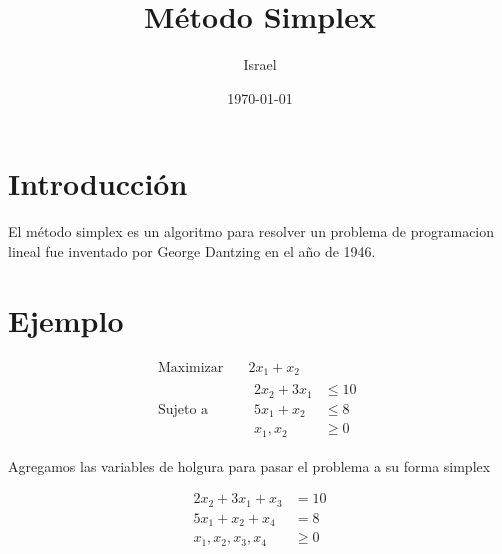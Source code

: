 \documentclass{article}
\title{Método Simplex}
\author{Israel}
\date{\today}
\begin{document}
\maketitle

\section{Introducción}
El método simplex es un algoritmo para resolver un problema de
programacion lineal fue inventado por George Dantzing en el año de
1946.

\section{Ejemplo}
\label{sec:ejemplo}


\begin{equation*}
  
  \begin{aligned}
   \text{Maximizar} \quad & 2x_1+x_2 \\
   \text{Sujeto a} \quad &
    
    \begin{aligned}
      2x_2+3x_1 & \leq 10 \\
      5x_1 + x_2 & \leq 8 \\
      x_1,x_2 & \geq 0
  \end{aligned}
 \end{aligned}
\end{equation*}

Agregamos las variables de holgura para pasar el problema a su forma simplex

\begin{equation*}
  
    \begin{aligned}
      2x_2+3x_1+x_3 & = 10 \\
      5x_1 + x_2 + x_4 & = 8 \\
      x_1,x_2,x_3,x_4 & \geq 0
 \end{aligned}
\end{equation*}
\end{document}
